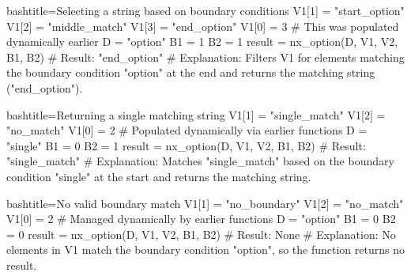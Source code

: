 \begin{NexCodeBox}{bash}{title={Selecting a string based on boundary conditions}}
	V1[1] = "start_option"
	V1[2] = "middle_match"
	V1[3] = "end_option"
	V1[0] = 3 # This was populated dynamically earlier
	D = "option"
	B1 = 1
	B2 = 1
	result = nx_option(D, V1, V2, B1, B2)
	# Result: "end_option"
	# Explanation: Filters V1 for elements matching the boundary condition "option" at the end and returns the matching string ("end_option").
\end{NexCodeBox}

\begin{NexCodeBox}{bash}{title={Returning a single matching string}}
	V1[1] = "single_match"
	V1[2] = "no_match"
	V1[0] = 2 # Populated dynamically via earlier functions
	D = "single"
	B1 = 0
	B2 = 1
	result = nx_option(D, V1, V2, B1, B2)
	# Result: "single_match"
	# Explanation: Matches "single_match" based on the boundary condition "single" at the start and returns the matching string.
\end{NexCodeBox}

\begin{NexCodeBox}{bash}{title={No valid boundary match}}
	V1[1] = "no_boundary"
	V1[2] = "no_match"
	V1[0] = 2 # Managed dynamically by earlier functions
	D = "option"
	B1 = 0
	B2 = 0
	result = nx_option(D, V1, V2, B1, B2)
	# Result: None
	# Explanation: No elements in V1 match the boundary condition "option", so the function returns no result.
\end{NexCodeBox}

